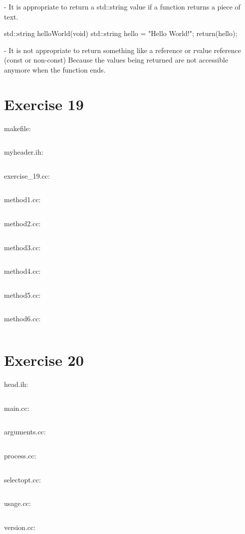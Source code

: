 \documentclass{article}[10pt]
\begin{document}
- It is appropriate to return a std::string value if a function returns a piece of text.

\begin{cpp}
std::string helloWorld(void)
{
    std::string hello = "Hello World!\n";
    return(hello);
}
\end{cpp}

- It is not appropriate to return something like a reference or rvalue reference (const or non-const)
Because the values being returned are not accessible anymore when the function ends. 



\section*{Exercise 19}
makefile:
\inputminted[linenos=true, bgcolor=cppbg, tabsize=4 , frame=lines]{make}{../19/makefile}
myheader.ih:
\inputminted[linenos=true, bgcolor=cppbg, tabsize=4 , frame=lines]{cpp}{../19/myheader.ih}
exercise\_19.cc:
\inputminted[linenos=true, bgcolor=cppbg, tabsize=4 , frame=lines]{cpp}{../19/exercise_19.cc}
method1.cc:
\inputminted[linenos=true, bgcolor=cppbg, tabsize=4 , frame=lines]{cpp}{../19/method1.cc}
method2.cc:
\inputminted[linenos=true, bgcolor=cppbg, tabsize=4 , frame=lines]{cpp}{../19/method2.cc}
method3.cc:
\inputminted[linenos=true, bgcolor=cppbg, tabsize=4 , frame=lines]{cpp}{../19/method3.cc}
method4.cc:
\inputminted[linenos=true, bgcolor=cppbg, tabsize=4 , frame=lines]{cpp}{../19/method4.cc}
method5.cc:
\inputminted[linenos=true, bgcolor=cppbg, tabsize=4 , frame=lines]{cpp}{../19/method5.cc}
method6.cc:
\inputminted[linenos=true, bgcolor=cppbg, tabsize=4 , frame=lines]{cpp}{../19/method6.cc}
\section*{Exercise 20}
 
head.ih:
\inputminted[linenos=true, bgcolor=cppbg, tabsize=4 , frame=lines]{cpp}{../20/head.ih}
main.cc:
\inputminted[linenos=true, bgcolor=cppbg, tabsize=4 , frame=lines]{cpp}{../20/main.cc}
arguments.cc:
\inputminted[linenos=true, bgcolor=cppbg, tabsize=4 , frame=lines]{cpp}{../20/arguments.cc}
process.cc:
\inputminted[linenos=true, bgcolor=cppbg, tabsize=4 , frame=lines]{cpp}{../20/process.cc}
selectopt.cc:
\inputminted[linenos=true, bgcolor=cppbg, tabsize=4 , frame=lines]{cpp}{../20/selectopt.cc}
usage.cc:
\inputminted[linenos=true, bgcolor=cppbg, tabsize=4 , frame=lines]{cpp}{../20/usage.cc}
version.cc:
\inputminted[linenos=true, bgcolor=cppbg, tabsize=4 , frame=lines]{cpp}{../20/version.cc}
\end{document}
